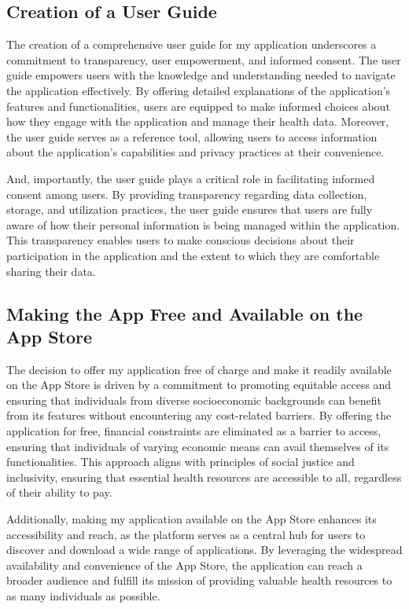 \subsection{Creation of a User Guide}

The creation of a comprehensive user guide for my application underscores a commitment to transparency, user empowerment, and informed consent. The user guide empowers users with the knowledge and understanding needed to navigate the application effectively. By offering detailed explanations of the application's features and functionalities, users are equipped to make informed choices about how they engage with the application and manage their health data. Moreover, the user guide serves as a reference tool, allowing users to access information about the application's capabilities and privacy practices at their convenience.

And, importantly, the user guide plays a critical role in facilitating informed consent among users. By providing transparency regarding data collection, storage, and utilization practices, the user guide ensures that users are fully aware of how their personal information is being managed within the application. This transparency enables users to make conscious decisions about their participation in the application and the extent to which they are comfortable sharing their data.

\subsection{Making the App Free and Available on the App Store}

The decision to offer my application free of charge and make it readily available on the App Store is driven by a commitment to promoting equitable access and ensuring that individuals from diverse socioeconomic backgrounds can benefit from its features without encountering any cost-related barriers. By offering the application for free, financial constraints are eliminated as a barrier to access, ensuring that individuals of varying economic means can avail themselves of its functionalities. This approach aligns with principles of social justice and inclusivity, ensuring that essential health resources are accessible to all, regardless of their ability to pay.

Additionally, making my application available on the App Store enhances its accessibility and reach, as the platform serves as a central hub for users to discover and download a wide range of applications. By leveraging the widespread availability and convenience of the App Store, the application can reach a broader audience and fulfill its mission of providing valuable health resources to as many individuals as possible.

